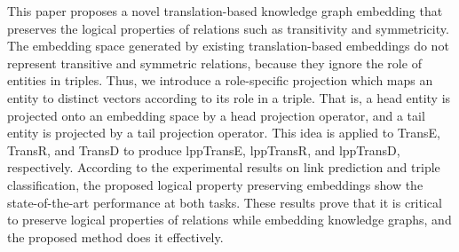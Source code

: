 This paper proposes a novel translation-based knowledge graph embedding that preserves the logical properties of relations such as transitivity and symmetricity. The embedding space generated by existing translation-based embeddings do not represent transitive and symmetric relations, because they ignore the role of entities in triples. Thus, we introduce a role-specific projection which maps an entity to distinct vectors according to its role in a triple. That is, a head entity is projected onto an embedding space by a head projection operator, and a tail entity is projected by a tail projection operator. This idea is applied to TransE, TransR, and TransD to produce lppTransE, lppTransR, and lppTransD, respectively. According to the experimental results on link prediction and triple classification, the proposed logical property preserving embeddings show the state-of-the-art performance at both tasks. These results prove that it is critical to preserve logical properties of relations while embedding knowledge graphs, and the proposed method does it effectively.
